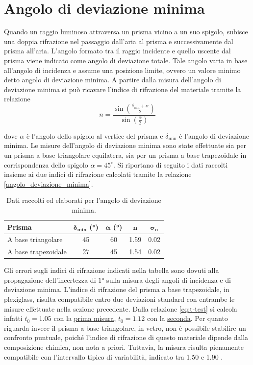 \section{Angolo di deviazione minima}
Quando un raggio luminoso attraversa un prisma vicino a un suo spigolo, subisce una doppia rifrazione nel passaggio dall'aria al prisma e successivamente dal prisma all'aria.
L'angolo formato tra il raggio incidente e quello uscente dal prisma viene indicato come angolo di deviazione totale. Tale angolo varia in base all'angolo di incidenza e assume una posizione limite, ovvero un valore minimo detto angolo di deviazione minima.
A partire dalla misura dell'angolo di deviazione minima si può ricavare l'indice di rifrazione del materiale tramite la relazione \\
\begin{equation}
n = \frac{\sin\!\left(\frac{\delta_{\mathrm{min}}+\alpha}{2}\right)}{\sin\!\left(\frac{\alpha}{2}\right)}
\label{angolo_deviazione_minima}
\end{equation}

dove $\alpha$ è l'angolo dello spigolo al vertice del prisma e $\delta_{\mathrm{min}}$ è l'angolo di deviazione minima.
Le misure dell'angolo di deviazione minima sono state effettuate sia per un prisma a base triangolare equilatera, sia per un prisma a base trapezoidale in corrispondenza dello spigolo $\alpha=45^\circ$.
Si riportano di seguito i dati raccolti insieme ai due indici di rifrazione calcolati tramite la relazione \eqref{angolo_deviazione_minima}.\\

\begin{table}[htbp]
\centering
\begin{tabular}{lcccc}
\toprule
\textbf{Prisma} & $\bm{\delta_{\text{min}}}$ \textbf{\small{(\unit{\degree})}} & $\bm{\alpha}$ \textbf{\small{(\unit{\degree})}} & $\mathbf{n}$ & $\bm{\sigma_{\text{n}}}$ \\
\midrule
A base triangolare  & 45 & 60 & 1.59 & 0.02 \\
A base trapezoidale & 27 & 45 & 1.54 & 0.02 \\
\bottomrule
\end{tabular}
\caption{Dati raccolti ed elaborati per l'angolo di deviazione minima.}
\label{tab:deviazione_minima}
\end{table}

Gli errori sugli indici di rifrazione indicati nella tabella sono dovuti alla propagazione dell'incertezza di $\ang{1}$  sulla misura degli angoli di incidenza e di deviazione minima.
L'indice di rifrazione del prisma a base trapezoidale, in plexiglass, risulta compatibile entro due deviazioni standard con entrambe le misure effettuate nella sezione precedente. Dalla relazione \eqref{eq:t-test} si calcola infatti $t_0=1.05$ con la \hyperref[misura-1]{prima misura}, $t_0=1.12$ con la \hyperref[misura-2]{seconda}. Per quanto riguarda invece il prisma a base triangolare, in vetro, non è possibile stabilire un confronto puntuale, poiché l'indice di rifrazione di questo materiale dipende dalla composizione chimica, non nota a priori. Tuttavia, la misura risulta pienamente compatibile con l'intervallo tipico di variabilità, indicato tra 1.50 e 1.90 \cite{wikipedia_vetro}.
